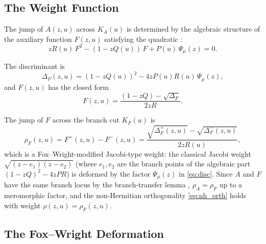 \documentclass{article}
\begin{document}
\subsection{The Weight Function}
\label{sec:weight}

The jump of $A(z,u)$ across $K_A(u)$ is determined by the algebraic
structure of the auxiliary function $F(z,u)$ satisfying the quadratic
\cite{Crowley2026}:
\begin{equation}\label{eq:quad}
  z R(u)\,F^2 - (1 - z Q(u))\,F + P(u)\,\Psi_\mu(z) = 0.
\end{equation}

The discriminant is
\begin{equation}\label{eq:disc}
  \Delta_F(z,u) = (1 - zQ(u))^2 - 4z P(u) R(u)\,\Psi_\mu(z),
\end{equation}
and $F(z,u)$ has the closed form
\begin{equation}\label{eq:F_closed}
  F(z,u) = \frac{(1-zQ) - \sqrt{\Delta_F}}{2zR}.
\end{equation}

The jump of $F$ across the branch cut $K_F(u)$ is
\begin{equation}\label{eq:jump_F}
  \rho_F(z,u) = F^+(z,u) - F^-(z,u) = \frac{\sqrt{\Delta_F^+(z,u)} - \sqrt{\Delta_F^-(z,u)}}{2zR(u)},
\end{equation}
which is a Fox--Wright-modified Jacobi-type weight: the classical Jacobi
weight $\sqrt{(z-e_1)(z-e_2)}$ (where $e_1, e_2$ are the branch points of
the algebraic part $(1-zQ)^2 - 4zPR$) is deformed by the factor $\Psi_\mu(z)$
in \eqref{eq:disc}. Since $A$ and $F$ have the same branch locus by the
branch-transfer lemma \cite{Crowley2026}, $\rho_A = \rho_F$ up to a
meromorphic factor, and the non-Hermitian orthogonality \eqref{eq:nh_orth}
holds with weight $\rho(z,u) = \rho_F(z,u)$.

\subsection{The Fox--Wright Deformation}
\end{document}
